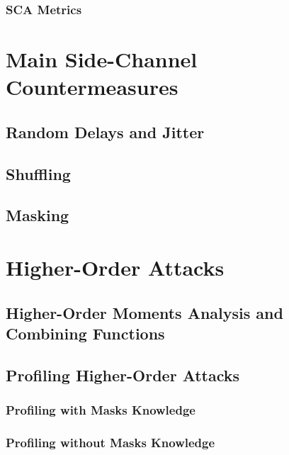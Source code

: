 \subsubsection{SCA Metrics}



\section{Main Side-Channel Countermeasures}
\subsection{Random Delays and Jitter}
\subsection{Shuffling}
\subsection{Masking}



\section{Higher-Order Attacks}
\subsection{Higher-Order Moments Analysis and Combining Functions}
\subsection{Profiling Higher-Order Attacks}
\subsubsection{Profiling with Masks Knowledge}
\subsubsection{Profiling without Masks Knowledge}

